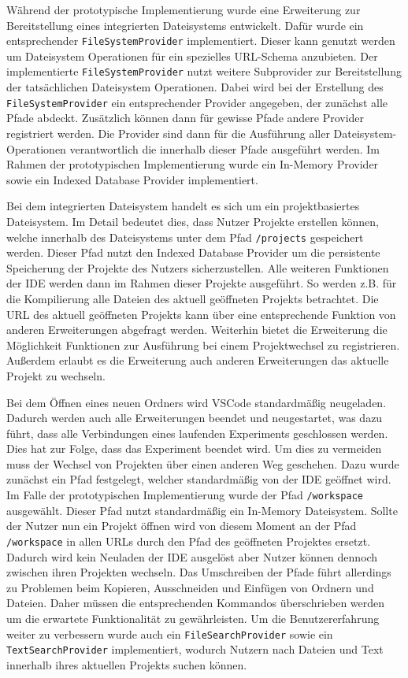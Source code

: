 Während der prototypische Implementierung wurde eine Erweiterung zur Bereitstellung eines integrierten Dateisystems entwickelt. Dafür wurde ein entsprechender \texttt{FileSystemProvider} implementiert. Dieser kann genutzt werden um Dateisystem Operationen für ein spezielles URL-Schema anzubieten. Der implementierte \texttt{FileSystemProvider} nutzt weitere Subprovider zur Bereitstellung der tatsächlichen Dateisystem Operationen. Dabei wird bei der Erstellung des \texttt{FileSystemProvider} ein entsprechender Provider angegeben, der zunächst alle Pfade abdeckt. Zusätzlich können dann für gewisse Pfade andere Provider registriert werden. Die Provider sind dann für die Ausführung aller Dateisystem-Operationen verantwortlich die innerhalb dieser Pfade ausgeführt werden. Im Rahmen der prototypischen Implementierung wurde ein In-Memory Provider sowie ein Indexed Database Provider implementiert.

Bei dem integrierten Dateisystem handelt es sich um ein projektbasiertes Dateisystem. Im Detail bedeutet dies, dass Nutzer Projekte erstellen können, welche innerhalb des Dateisystems unter dem Pfad \texttt{/projects} gespeichert werden. Dieser Pfad nutzt den Indexed Database Provider um die persistente Speicherung der Projekte des Nutzers sicherzustellen. Alle weiteren Funktionen der IDE werden dann im Rahmen dieser Projekte ausgeführt. So werden z.B. für die Kompilierung alle Dateien des aktuell geöffneten Projekts betrachtet. Die URL des aktuell geöffneten Projekts kann über eine entsprechende Funktion von anderen Erweiterungen abgefragt werden. Weiterhin bietet die Erweiterung die Möglichkeit Funktionen zur Ausführung bei einem Projektwechsel zu registrieren. Außerdem erlaubt es die Erweiterung auch anderen Erweiterungen das aktuelle Projekt zu wechseln.

Bei dem Öffnen eines neuen Ordners wird VSCode standardmäßig neugeladen. Dadurch werden auch alle Erweiterungen beendet und neugestartet, was dazu führt, dass alle Verbindungen eines laufenden Experiments geschlossen werden. Dies hat zur Folge, dass das Experiment beendet wird. Um dies zu vermeiden muss der Wechsel von Projekten über einen anderen Weg geschehen. Dazu wurde zunächst ein Pfad festgelegt, welcher standardmäßig von der IDE geöffnet wird. Im Falle der prototypischen Implementierung wurde der Pfad \texttt{/workspace} ausgewählt. Dieser Pfad nutzt standardmäßig ein In-Memory Dateisystem. Sollte der Nutzer nun ein Projekt öffnen wird von diesem Moment an der Pfad \texttt{/workspace} in allen URLs durch den Pfad des geöffneten Projektes ersetzt. Dadurch wird kein Neuladen der IDE ausgelöst aber Nutzer können dennoch zwischen ihren Projekten wechseln. Das Umschreiben der Pfade führt allerdings zu Problemen beim Kopieren, Ausschneiden und Einfügen von Ordnern und Dateien. Daher müssen die entsprechenden Kommandos überschrieben werden um die erwartete Funktionalität zu gewährleisten. Um die Benutzererfahrung weiter zu verbessern wurde auch ein \texttt{FileSearchProvider} sowie ein \texttt{TextSearchProvider} implementiert, wodurch Nutzern nach Dateien und Text innerhalb ihres aktuellen Projekts suchen können.

